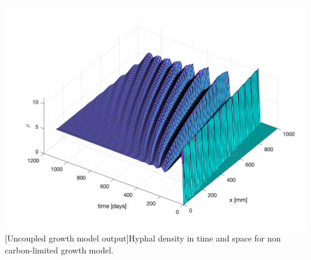 \documentclass[12pt]{article}
\begin{document}
\begin{center}\label{Rho Growth 3D}
\includegraphics[width=\linewidth]{rho_growth_no_Cterm.png}
[Uncoupled growth model output]{Hyphal density in time and space for non carbon-limited growth model.}
\end{center}
\end{document}
